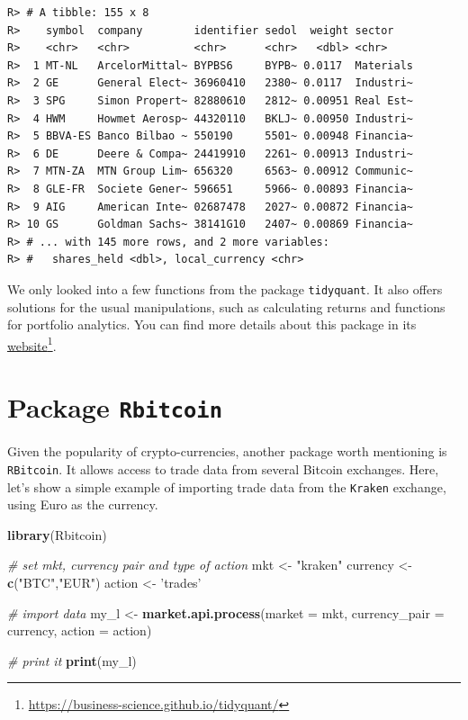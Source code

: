 \documentclass[
  12pt,
]{book}
\newenvironment{Shaded}{\begin{snugshade}}{\end{snugshade}}
\newcommand{\CommentTok}[1]{\textcolor[rgb]{0.37,0.37,0.37}{\textit{#1}}}
\newcommand{\DataTypeTok}[1]{\textcolor[rgb]{0.27,0.27,0.27}{#1}}
\newcommand{\KeywordTok}[1]{\textcolor[rgb]{0.27,0.27,0.27}{\textbf{#1}}}
\newcommand{\NormalTok}[1]{#1}
\newcommand{\StringTok}[1]{\textcolor[rgb]{0.5,0.5,0.5}{#1}}
\begin{document}
\begin{verbatim}
R> # A tibble: 155 x 8
R>    symbol  company        identifier sedol  weight sector   
R>    <chr>   <chr>          <chr>      <chr>   <dbl> <chr>    
R>  1 MT-NL   ArcelorMittal~ BYPBS6     BYPB~ 0.0117  Materials
R>  2 GE      General Elect~ 36960410   2380~ 0.0117  Industri~
R>  3 SPG     Simon Propert~ 82880610   2812~ 0.00951 Real Est~
R>  4 HWM     Howmet Aerosp~ 44320110   BKLJ~ 0.00950 Industri~
R>  5 BBVA-ES Banco Bilbao ~ 550190     5501~ 0.00948 Financia~
R>  6 DE      Deere & Compa~ 24419910   2261~ 0.00913 Industri~
R>  7 MTN-ZA  MTN Group Lim~ 656320     6563~ 0.00912 Communic~
R>  8 GLE-FR  Societe Gener~ 596651     5966~ 0.00893 Financia~
R>  9 AIG     American Inte~ 02687478   2027~ 0.00872 Financia~
R> 10 GS      Goldman Sachs~ 38141G10   2407~ 0.00869 Financia~
R> # ... with 145 more rows, and 2 more variables:
R> #   shares_held <dbl>, local_currency <chr>
\end{verbatim}

We only looked into a few functions from the package \texttt{tidyquant}. It also offers solutions for the usual manipulations, such as calculating returns and functions for portfolio analytics. You can find more details about this package in its \href{https://business-science.github.io/tidyquant/}{website}\footnote{\url{https://business-science.github.io/tidyquant/}}.

\hypertarget{package-rbitcoin}{%
\section{\texorpdfstring{Package \texttt{Rbitcoin}}{Package Rbitcoin}}\label{package-rbitcoin}}

Given the popularity of crypto-currencies, another package worth mentioning is \texttt{RBitcoin}. It allows access to trade data from several Bitcoin exchanges. Here, let's show a simple example of importing trade data from the \texttt{\textquotesingle{}Kraken\textquotesingle{}} exchange, using Euro as the currency.

\begin{Shaded}
\begin{Highlighting}[]
\KeywordTok{library}\NormalTok{(Rbitcoin)}

\CommentTok{# set mkt, currency pair and type of action}
\NormalTok{mkt <-}\StringTok{ "kraken"}
\NormalTok{currency <-}\StringTok{ }\KeywordTok{c}\NormalTok{(}\StringTok{"BTC"}\NormalTok{,}\StringTok{"EUR"}\NormalTok{)}
\NormalTok{action <-}\StringTok{ 'trades'}

\CommentTok{# import data}
\NormalTok{my_l <-}\StringTok{ }\KeywordTok{market.api.process}\NormalTok{(}\DataTypeTok{market =}\NormalTok{ mkt,}
                           \DataTypeTok{currency_pair =}\NormalTok{ currency,}
                           \DataTypeTok{action =}\NormalTok{ action)}

\CommentTok{# print it}
\KeywordTok{print}\NormalTok{(my_l)}
\end{Highlighting}
\end{Shaded}
\end{document}
